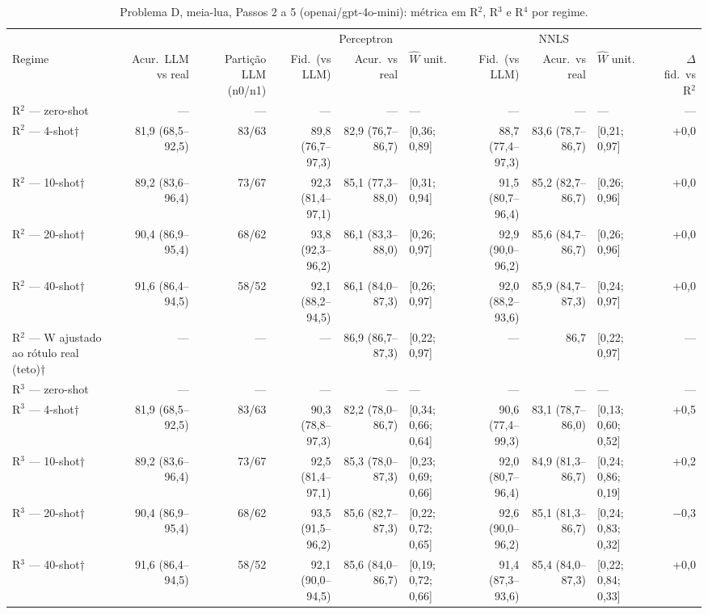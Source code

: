 \begin{table}[htbp]
\centering
\footnotesize
\caption{Problema D, meia-lua, Passos 2 a 5 (openai/gpt-4o-mini): métrica em R$^2$, R$^3$ e R$^4$ por regime.}
\label{tab:D_passos_2_a_5_gpt4mini}
\begin{tabular}{lrrrrlrrlr}
\toprule
 &  &  & \multicolumn{3}{c}{Perceptron} & \multicolumn{3}{c}{NNLS} &  \\ \cmidrule(lr){4-6} \cmidrule(lr){7-9}
Regime & Acur.\ LLM vs real & Partição LLM (n0/n1) & Fid.\ (vs LLM) & Acur.\ vs real & $\hat{W}$ unit. & Fid.\ (vs LLM) & Acur.\ vs real & $\hat{W}$ unit. & $\Delta$ fid.\ vs R$^2$ \\
\midrule
R$^2$ — zero-shot & — & — & — & — & — & — & — & — & — \\
R$^2$ — 4-shot† & 81,9 (68,5–92,5) & 83/63 & 89,8 (76,7–97,3) & 82,9 (76,7–86,7) & [0,36; 0,89] & 88,7 (77,4–97,3) & 83,6 (78,7–86,7) & [0,21; 0,97] & +0,0 \\
R$^2$ — 10-shot† & 89,2 (83,6–96,4) & 73/67 & 92,3 (81,4–97,1) & 85,1 (77,3–88,0) & [0,31; 0,94] & 91,5 (80,7–96,4) & 85,2 (82,7–86,7) & [0,26; 0,96] & +0,0 \\
R$^2$ — 20-shot† & 90,4 (86,9–95,4) & 68/62 & 93,8 (92,3–96,2) & 86,1 (83,3–88,0) & [0,26; 0,97] & 92,9 (90,0–96,2) & 85,6 (84,7–86,7) & [0,26; 0,96] & +0,0 \\
R$^2$ — 40-shot† & 91,6 (86,4–94,5) & 58/52 & 92,1 (88,2–94,5) & 86,1 (84,0–87,3) & [0,26; 0,97] & 92,0 (88,2–93,6) & 85,9 (84,7–87,3) & [0,24; 0,97] & +0,0 \\
R$^2$ — W ajustado ao rótulo real (teto)† & — & — & — & 86,9 (86,7–87,3) & [0,22; 0,97] & — & 86,7 & [0,22; 0,97] & — \\
\midrule
R$^3$ — zero-shot & — & — & — & — & — & — & — & — & — \\
R$^3$ — 4-shot† & 81,9 (68,5–92,5) & 83/63 & 90,3 (78,8–97,3) & 82,2 (78,0–86,7) & [0,34; 0,66; 0,64] & 90,6 (77,4–99,3) & 83,1 (78,7–86,0) & [0,13; 0,60; 0,52] & +0,5 \\
R$^3$ — 10-shot† & 89,2 (83,6–96,4) & 73/67 & 92,5 (81,4–97,1) & 85,3 (78,0–87,3) & [0,23; 0,69; 0,66] & 92,0 (80,7–96,4) & 84,9 (81,3–86,7) & [0,24; 0,86; 0,19] & +0,2 \\
R$^3$ — 20-shot† & 90,4 (86,9–95,4) & 68/62 & 93,5 (91,5–96,2) & 85,6 (82,7–87,3) & [0,22; 0,72; 0,65] & 92,6 (90,0–96,2) & 85,1 (81,3–86,7) & [0,24; 0,83; 0,32] & $-$0,3 \\
R$^3$ — 40-shot† & 91,6 (86,4–94,5) & 58/52 & 92,1 (90,0–94,5) & 85,6 (84,0–86,7) & [0,19; 0,72; 0,66] & 91,4 (87,3–93,6) & 85,4 (84,0–87,3) & [0,22; 0,84; 0,33] & +0,0 \\

\end{tabular}
\end{table}
